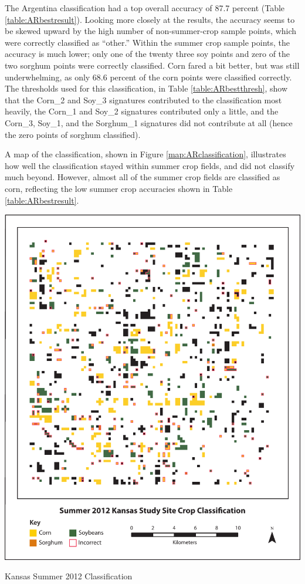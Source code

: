 The Argentina classification had a top overall accuracy of 87.7 percent (Table \ref{table:ARbestresult}). Looking more closely at the results, the accuracy seems to be skewed upward by the high number of non-summer-crop sample points, which were correctly classified as ``other.'' Within the summer crop sample points, the accuracy is much lower; only one of the twenty three soy points and zero of the two sorghum points were correctly classified. Corn fared a bit better, but was still underwhelming, as only 68.6 percent of the corn points were classified correctly. The thresholds used for this classification, in Table \ref{table:ARbestthresh}, show that the Corn\_2 and Soy\_3 signatures contributed to the classification most heavily, the Corn\_1 and Soy\_2 signatures contributed only a little, and the Corn\_3, Soy\_1, and the Sorghum\_1 signatures did not contribute at all (hence the zero points of sorghum classified).

A map of the classification, shown in Figure \ref{map:ARclassification}, illustrates how well the classification stayed within summer crop fields, and did not classify much beyond. However, almost all of the summer crop fields are classified as corn, reflecting the low summer crop accuracies shown in Table \ref{table:ARbestresult}.

\begin{ssfigure}
  \centering
  \includegraphics[width=\textwidth]{Graphics/KSclass.pdf}
  \caption{Kansas Summer 2012 Classification}
  \label{map:KSclassification}
\end{ssfigure}

